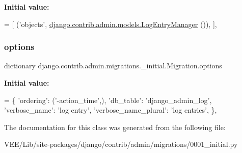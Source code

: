 {\bfseries Initial value\+:}
\begin{DoxyCode}
= [
                (\textcolor{stringliteral}{'objects'}, \mbox{\hyperlink{classdjango_1_1contrib_1_1admin_1_1models_1_1_log_entry_manager}{django.contrib.admin.models.LogEntryManager}}
      ()),
            ],
\end{DoxyCode}
\mbox{\label{classdjango_1_1contrib_1_1admin_1_1migrations_1_10001__initial_1_1_migration_a24eccfe38aceba48444014de45a6d6e4}} 
\subsubsection{\texorpdfstring{options}{options}}
{\footnotesize\ttfamily dictionary django.\+contrib.\+admin.\+migrations.\+\_\+initial.\+Migration.\+options\hspace{0.3cm}{\ttfamily [static]}}

{\bfseries Initial value\+:}
\begin{DoxyCode}
= \{
                \textcolor{stringliteral}{'ordering'}: (\textcolor{stringliteral}{'-action\_time'},),
                \textcolor{stringliteral}{'db\_table'}: \textcolor{stringliteral}{'django\_admin\_log'},
                \textcolor{stringliteral}{'verbose\_name'}: \textcolor{stringliteral}{'log entry'},
                \textcolor{stringliteral}{'verbose\_name\_plural'}: \textcolor{stringliteral}{'log entries'},
            \},
\end{DoxyCode}


The documentation for this class was generated from the following file\+:\begin{DoxyCompactItemize}
\item 
V\+E\+E/\+Lib/site-\/packages/django/contrib/admin/migrations/0001\+\_\+initial.\+py\end{DoxyCompactItemize}
